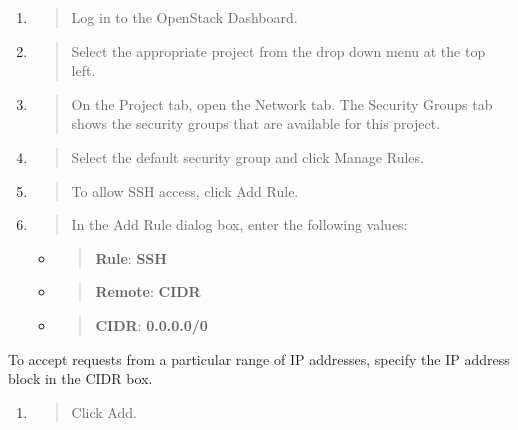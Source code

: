 {\begin{enumerate}
\def\labelenumi{\arabic{enumi}.}
\item
  \begin{quote}
  Log in to the \gls{OpenStack Dashboard}.
  \end{quote}
\item
  \begin{quote}
  Select the appropriate project from the drop down menu at the top
  left.
  \end{quote}
\item
  \begin{quote}
  On the Project tab, open the Network tab. The Security Groups tab
  shows the security groups that are available for this project.
  \end{quote}
\item
  \begin{quote}
  Select the default security group and click Manage Rules.
  \end{quote}
\item
  \begin{quote}
  To allow SSH access, click Add Rule.
  \end{quote}
\item
  \begin{quote}
  In the Add Rule dialog box, enter the following values:
  \end{quote}

  \begin{itemize}
  \item
    \begin{quote}
    \textbf{Rule}: \textbf{SSH}
    \end{quote}
  \item
    \begin{quote}
    \textbf{Remote}: \textbf{CIDR}
    \end{quote}
  \item
    \begin{quote}
    \textbf{CIDR}: \textbf{0.0.0.0/0}
    \end{quote}
  \end{itemize}
\end{enumerate}

 To accept requests from a particular range of IP
addresses, specify the IP address block in the CIDR box.

\begin{enumerate}
\def\labelenumi{\arabic{enumi}.}
\item
  \begin{quote}
  Click Add.
  \end{quote}
\end{enumerate}

}
